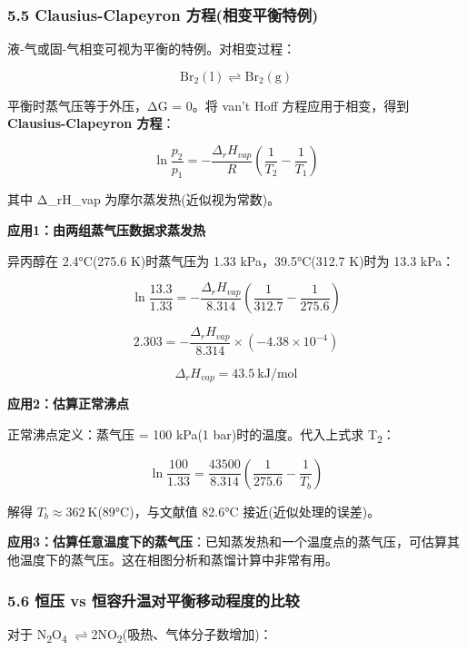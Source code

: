 \documentclass[a4paper,11pt]{ctexart}
\newcommand{\箭}{\ensuremath{\rightarrow}}
\newcommand{\左箭}{\ensuremath{\leftarrow}}
\newcommand{\上箭}{\ensuremath{\uparrow}}
\newcommand{\下箭}{\ensuremath{\downarrow}}
\newcommand{\衡}{\ensuremath{\rightleftharpoons}}
\newcommand{\双箭}{\ensuremath{\leftrightarrow}}
\newcommand{\约等于}{\ensuremath{\approx}}
\newcommand{\小于等于}{\ensuremath{\leq}}
\newcommand{\大于等于}{\ensuremath{\geq}}
\newcommand{\不等于}{\ensuremath{\neq}}
\newcommand{\西格马}{\ensuremath{\sigma}}
\newcommand{\派}{\ensuremath{\pi}}
\begin{document}
\subsubsection{5.5 Clausius-Clapeyron 方程(相变平衡特例)}\label{clausius-clapeyron-ux65b9ux7a0bux76f8ux53d8ux5e73ux8861ux7279ux4f8b}

液-气或固-气相变可视为平衡的特例。对相变过程：

\[
\mathrm{Br_2(l) \rightleftharpoons Br_2(g)}
\]

平衡时蒸气压等于外压，ΔG = 0。将 van't Hoff 方程应用于相变，得到 \textbf{Clausius-Clapeyron 方程}：

\[
\boxed{\ln\frac{p_2}{p_1} = -\frac{\Delta_r H_{vap}}{R}\left(\frac{1}{T_2} - \frac{1}{T_1}\right)}
\]

其中 Δ\_rH\_vap 为摩尔蒸发热(近似视为常数)。

\textbf{应用1：由两组蒸气压数据求蒸发热}

异丙醇在 2.4°C(275.6 K)时蒸气压为 1.33 kPa，39.5°C(312.7 K)时为 13.3 kPa：

\[
\ln\frac{13.3}{1.33} = -\frac{\Delta_r H_{vap}}{8.314}\left(\frac{1}{312.7} - \frac{1}{275.6}\right)
\]

\[
2.303 = -\frac{\Delta_r H_{vap}}{8.314} \times (-4.38 \times 10^{-4})
\]

\[
\Delta_r H_{vap} = 43.5\ \mathrm{kJ/mol}
\]

\textbf{应用2：估算正常沸点}

正常沸点定义：蒸气压 = 100 kPa(1 bar)时的温度。代入上式求 T\textsubscript{2}：

\[
\ln\frac{100}{1.33} = \frac{43500}{8.314}\left(\frac{1}{275.6} - \frac{1}{T_b}\right)
\]

解得 \(T_b \approx 362\ \mathrm{K}\)(89°C)，与文献值 82.6°C 接近(近似处理的误差)。

\textbf{应用3：估算任意温度下的蒸气压}：已知蒸发热和一个温度点的蒸气压，可估算其他温度下的蒸气压。这在相图分析和蒸馏计算中非常有用。

\subsubsection{5.6 恒压 vs 恒容升温对平衡移动程度的比较}\label{ux6052ux538b-vs-ux6052ux5bb9ux5347ux6e29ux5bf9ux5e73ux8861ux79fbux52a8ux7a0bux5ea6ux7684ux6bd4ux8f83}

对于 N\textsubscript{2}O\textsubscript{4} \衡 2NO\textsubscript{2}(吸热、气体分子数增加)：
\end{document}
